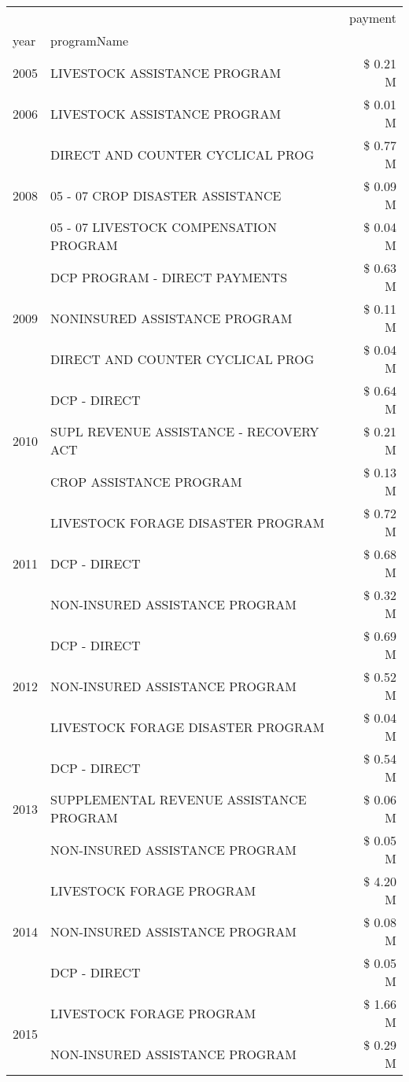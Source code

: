 \begin{tabular}{llr}
\toprule
 &  & payment \\
year & programName &  \\
\midrule
2005 & LIVESTOCK ASSISTANCE PROGRAM & \$ 0.21 M \\
\cline{1-3}
2006 & LIVESTOCK ASSISTANCE PROGRAM & \$ 0.01 M \\
\cline{1-3}
\multirow[t]{3}{*}{2008} & DIRECT AND COUNTER CYCLICAL PROG & \$ 0.77 M \\
 & 05 - 07 CROP DISASTER ASSISTANCE & \$ 0.09 M \\
 & 05 - 07 LIVESTOCK COMPENSATION PROGRAM & \$ 0.04 M \\
\cline{1-3}
\multirow[t]{3}{*}{2009} & DCP PROGRAM - DIRECT PAYMENTS & \$ 0.63 M \\
 & NONINSURED ASSISTANCE PROGRAM & \$ 0.11 M \\
 & DIRECT AND COUNTER CYCLICAL PROG & \$ 0.04 M \\
\cline{1-3}
\multirow[t]{3}{*}{2010} & DCP - DIRECT & \$ 0.64 M \\
 & SUPL REVENUE ASSISTANCE - RECOVERY ACT & \$ 0.21 M \\
 & CROP ASSISTANCE PROGRAM & \$ 0.13 M \\
\cline{1-3}
\multirow[t]{3}{*}{2011} & LIVESTOCK FORAGE DISASTER PROGRAM & \$ 0.72 M \\
 & DCP - DIRECT & \$ 0.68 M \\
 & NON-INSURED ASSISTANCE PROGRAM & \$ 0.32 M \\
\cline{1-3}
\multirow[t]{3}{*}{2012} & DCP - DIRECT & \$ 0.69 M \\
 & NON-INSURED ASSISTANCE PROGRAM & \$ 0.52 M \\
 & LIVESTOCK FORAGE DISASTER PROGRAM & \$ 0.04 M \\
\cline{1-3}
\multirow[t]{3}{*}{2013} & DCP - DIRECT & \$ 0.54 M \\
 & SUPPLEMENTAL REVENUE ASSISTANCE PROGRAM & \$ 0.06 M \\
 & NON-INSURED ASSISTANCE PROGRAM & \$ 0.05 M \\
\cline{1-3}
\multirow[t]{3}{*}{2014} & LIVESTOCK FORAGE PROGRAM & \$ 4.20 M \\
 & NON-INSURED ASSISTANCE PROGRAM & \$ 0.08 M \\
 & DCP - DIRECT & \$ 0.05 M \\
\cline{1-3}
\multirow[t]{3}{*}{2015} & LIVESTOCK FORAGE PROGRAM & \$ 1.66 M \\
 & NON-INSURED ASSISTANCE PROGRAM & \$ 0.29 M \\

\end{tabular}
